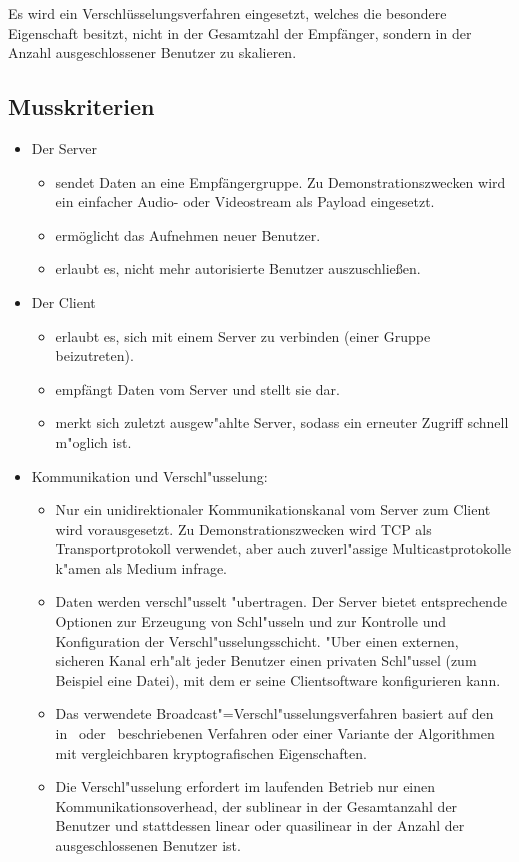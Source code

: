 \documentclass[a4paper,10pt]{scrartcl}
\begin{document}
Es wird ein Verschlüsselungsverfahren eingesetzt, welches die besondere
Eigenschaft besitzt, nicht in der Gesamtzahl der Empfänger, sondern in der Anzahl
ausgeschlossener Benutzer zu skalieren.

\subsection{Musskriterien}

\begin{itemize}

\item Der Server
\begin{itemize}
   \item sendet Daten an eine Empfängergruppe. Zu Demonstrationszwecken wird
         ein einfacher Audio- oder Videostream als Payload eingesetzt.
   \item ermöglicht das Aufnehmen neuer Benutzer.
   \item erlaubt es, nicht mehr autorisierte Benutzer auszuschließen.
\end{itemize}

\item Der Client
\begin{itemize}
   \item erlaubt es, sich mit einem Server zu verbinden (einer Gruppe beizutreten).
   \item empfängt Daten vom Server und stellt sie dar.
   \item merkt sich zuletzt ausgew"ahlte Server, sodass ein erneuter Zugriff schnell
         m"oglich ist.
\end{itemize}

\item Kommunikation und Verschl"usselung:
\begin{itemize}
   \item Nur ein unidirektionaler Kommunikationskanal vom Server zum Client wird
         vorausgesetzt. Zu Demonstrationszwecken wird TCP als Transportprotokoll
         verwendet, aber auch zuverl"assige Multicastprotokolle k"amen als Medium
         infrage.
   \item Daten werden verschl"usselt "ubertragen. Der Server bietet entsprechende
         Optionen zur Erzeugung von Schl"usseln und zur Kontrolle und Konfiguration
         der Verschl"usselungsschicht. "Uber einen externen, sicheren Kanal erh"alt
         jeder Benutzer einen privaten Schl"ussel (zum Beispiel eine Datei), mit dem er seine
         Clientsoftware konfigurieren kann.
   \item Das verwendete Broadcast"=Verschl"usselungsverfahren basiert auf den
         in~\cite[Section~2.2]{Naor00} oder~\cite{Garg10} beschriebenen Verfahren
         oder einer Variante der Algorithmen mit vergleichbaren kryptografischen
         Eigenschaften.
   \item Die Verschl"usselung erfordert im laufenden Betrieb nur einen
         Kommunikationsoverhead, der sublinear in der Gesamtanzahl der Benutzer und
         stattdessen linear oder quasilinear in der Anzahl der ausgeschlossenen
         Benutzer ist.
\end{itemize}
\end{itemize}
\end{document}
